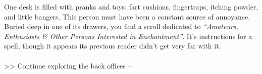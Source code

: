 One desk is filled with pranks and toys: fart cushions, fingertraps, itching powder, and little bangers. This person must have been a constant source of annoyance.\\

Buried deep in one of its drawers, you find a scroll dedicated to \emph{“Amateurs, Enthusiasts \& Other Persons Interested in Enchantment”}. It’s instructions for a spell, though it appears its previous reader didn’t get very far with it.\\
\\

>> Continue exploring the back offices -- 